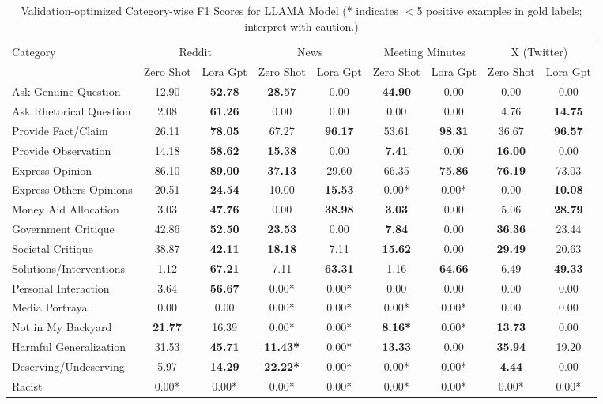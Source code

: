 \begin{table}[htbp]
\centering
\begin{tabular}{l *{8}{c}}
\toprule
Category & \multicolumn{2}{c}{Reddit} & \multicolumn{2}{c}{News} & \multicolumn{2}{c}{Meeting Minutes} & \multicolumn{2}{c}{X (Twitter)} \\
& Zero Shot & Lora Gpt & Zero Shot & Lora Gpt & Zero Shot & Lora Gpt & Zero Shot & Lora Gpt \\
\midrule
Ask Genuine Question & 12.90 & \textbf{52.78} & \textbf{28.57} & 0.00 & \textbf{44.90} & 0.00 & 0.00 & 0.00 \\
Ask Rhetorical Question & 2.08 & \textbf{61.26} & 0.00 & 0.00 & 0.00 & 0.00 & 4.76 & \textbf{14.75} \\
Provide Fact/Claim & 26.11 & \textbf{78.05} & 67.27 & \textbf{96.17} & 53.61 & \textbf{98.31} & 36.67 & \textbf{96.57} \\
Provide Observation & 14.18 & \textbf{58.62} & \textbf{15.38} & 0.00 & \textbf{7.41} & 0.00 & \textbf{16.00} & 0.00 \\
Express Opinion & 86.10 & \textbf{89.00} & \textbf{37.13} & 29.60 & 66.35 & \textbf{75.86} & \textbf{76.19} & 73.03 \\
Express Others Opinions & 20.51 & \textbf{24.54} & 10.00 & \textbf{15.53} & 0.00* & 0.00* & 0.00 & \textbf{10.08} \\
Money Aid Allocation & 3.03 & \textbf{47.76} & 0.00 & \textbf{38.98} & \textbf{3.03} & 0.00 & 5.06 & \textbf{28.79} \\
Government Critique & 42.86 & \textbf{52.50} & \textbf{23.53} & 0.00 & \textbf{7.84} & 0.00 & \textbf{36.36} & 23.44 \\
Societal Critique & 38.87 & \textbf{42.11} & \textbf{18.18} & 7.11 & \textbf{15.62} & 0.00 & \textbf{29.49} & 20.63 \\
Solutions/Interventions & 1.12 & \textbf{67.21} & 7.11 & \textbf{63.31} & 1.16 & \textbf{64.66} & 6.49 & \textbf{49.33} \\
Personal Interaction & 3.64 & \textbf{56.67} & 0.00* & 0.00* & 0.00 & 0.00 & 0.00 & 0.00 \\
Media Portrayal & 0.00 & 0.00 & 0.00* & 0.00* & 0.00* & 0.00* & 0.00 & 0.00 \\
Not in My Backyard & \textbf{21.77} & 16.39 & 0.00* & 0.00* & \textbf{8.16*} & 0.00* & \textbf{13.73} & 0.00 \\
Harmful Generalization & 31.53 & \textbf{45.71} & \textbf{11.43*} & 0.00* & \textbf{13.33} & 0.00 & \textbf{35.94} & 19.20 \\
Deserving/Undeserving & 5.97 & \textbf{14.29} & \textbf{22.22*} & 0.00* & 0.00* & 0.00* & \textbf{4.44} & 0.00 \\
Racist & 0.00* & 0.00* & 0.00* & 0.00* & 0.00* & 0.00* & 0.00* & 0.00* \\
\bottomrule
\end{tabular}
\centering\caption{Validation-optimized Category-wise F1 Scores for LLAMA Model (* indicates $<$5 positive examples in gold labels; interpret with caution.)}
\label{tab:llama_category_breakdown}
\end{table}